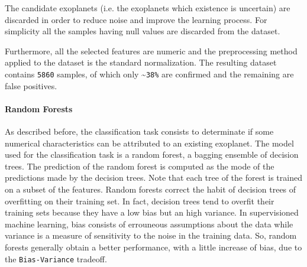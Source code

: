 \documentclass[11pt, a4paper]{article}
\begin{document}
    The candidate exoplanets (i.e. the exoplanets which existence is uncertain) are discarded in order to reduce noise and improve the learning process.
    For simplicity all the samples having null values are discarded from the dataset.

    Furthermore, all the selected features are numeric and the preprocessing method applied to the dataset is the standard normalization.
    The resulting dataset contains \texttt{5860} samples, of which only \textasciitilde \texttt{38\%} are confirmed and the remaining are false positives.
    
  \paragraph{Random Forests}
    As described before, the classification task consists to determinate if some numerical characteristics can be attributed to an existing exoplanet.
    The model used for the classification task is a random forest, a bagging ensemble of decision trees.
    The prediction of the random forest is computed as the mode of the predictions made by the decision trees.
    Note that each tree of the forest is trained on a subset of the features.
    Random forests correct the habit of decision trees of overfitting on their training set.
    In fact, decision trees tend to overfit their training sets because they have a low bias but an high variance.
    In supervisioned machine learning, bias consists of errouneous assumptions about the data while variance is a measure of sensitivity to the noise in the training data.
    So, random forests generally obtain a better performance, with a little increase of bias, due to the \texttt{Bias-Variance} tradeoff.
    
\end{document}
